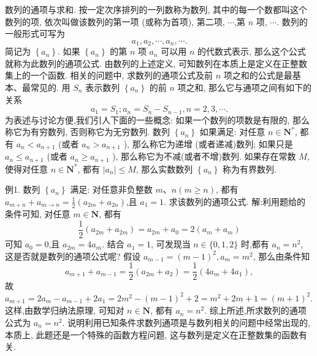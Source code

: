 
数列的通项与求和.
按一定次序排列的一列数称为数列, 其中的每一个数都叫这个数列的项, 依次叫做该数列的第一项 (或称为首项), 第二项, $\cdots$,第 $n$ 项, $\cdots$.
数列的一般形式可写为
$$
a_1, a_2, \cdots, a_n, \cdots .
$$
简记为 $\left\{a_n\right\}$. 如果 $\left\{a_n\right\}$ 的第 $n$ 项 $a_n$ 可以用 $n$ 的代数式表示, 那么这个公式就称为此数列的通项公式.
由数列的上述定义, 可知数列在本质上是定义在正整数集上的一个函数.
相关的问题中, 求数列的通项公式及前 $n$ 项之和的公式是最基本、最常见的.
用 $S_n$ 表示数列 $\left\{a_n\right\}$ 的前 $n$ 项之和, 那么它与通项之间有如下的关系
$$
a_1=S_1 ; a_n=S_n-S_{n-1}, n=2,3, \cdots .
$$
为表述与讨论方便,我们引人下面的一些概念:
如果一个数列的项数是有限的, 那么称它为有穷数列, 否则称它为无穷数列.
数列 $\left\{a_n\right\}$ 如果满足: 对任意 $n \in \mathbf{N}^*$, 都有 $a_n<a_{n+1}$ (或者 $a_n>a_{n+1}$ ), 那么称它为递增 (或者递减)数列; 如果只是 $a_n \leqslant a_{n+1}$ (或者 $a_n \geqslant a_{n+1}$ ), 那么称它为不减(或者不增)数列.
如果存在常数 $M$,使得对任意 $n \in \mathbf{N}^*$, 都有 $\left|a_n\right| \leqslant M$, 那么实数数列 $\left\{a_n\right\}$ 称为有界数列.



例1. 数列 $\left\{a_n\right\}$ 满足: 对任意非负整数 $m 、 n(m \geqslant n)$, 都有 $a_{m+n}+a_{m \rightarrow n}= \frac{1}{2}\left(a_{2 m}+a_{2 n}\right)$,且 $a_1=1$. 求该数列的通项公式.
解:利用题给的条件可知, 对任意 $m \in \mathbf{N}$, 都有
$$
\frac{1}{2}\left(a_{2 m}+a_{2 m}\right)=a_{2 m}+a_0=2\left(a_m+a_m\right)
$$
可知 $a_0=0$,且 $a_{2 m}=4 a_m$.
结合 $a_1=1$, 可发现当 $n \in\{0,1,2\}$ 时,都有 $a_n=n^2$, 这是否就是数列的通项公式呢?
假设 $a_{m-1}=(m-1)^2, a_m=m^2$, 那么由条件知
$$
a_{m+1}+a_{m-1}=\frac{1}{2}\left(a_{2 m}+a_2\right)=\frac{1}{2}\left(4 a_m+4 a_1\right),
$$
故 $a_{m+1}=2 a_m-a_{m-1}+2 a_1=2 m^2-(m-1)^2+2=m^2+2 m+1=(m+1)^2$. 这样,由数学归纳法原理, 可知对 $n \in \mathbf{N}$, 都有 $a_n=n^2$.
综上所述,所求数列的通项公式为 $a_n=n^2$.
说明利用已知条件求数列通项是与数列相关的问题中经常出现的, 本质上, 此题还是一个特殊的函数方程问题, 这与数列是定义在正整数集的函数有关.




